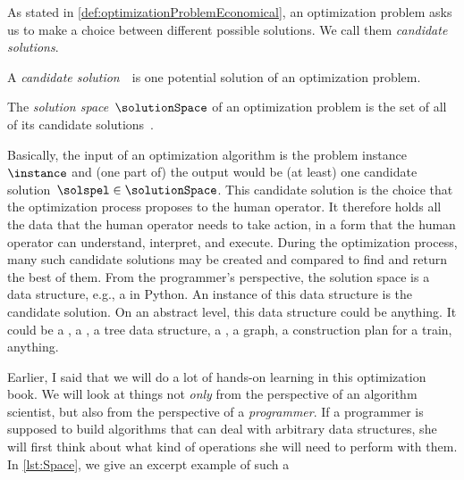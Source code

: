 %
\label{sec:solutionSpace}%
%
%
\label{sec:solutionSpaceDefinitions}%
%
As stated in \autoref{def:optimizationProblemEconomical}, an optimization problem asks us to make a choice between different possible solutions.
We call them \emph{candidate solutions}.
%
\begin{definition}%
\label{def:candidateSolution}%
A \emph{candidate solution}~\solspel\ is one potential solution of an optimization problem.%
\end{definition}%
%
\begin{definition}%
\label{def:solutionSpace}%
The \emph{solution space}~$\solutionSpace$ of an optimization problem is the set of all of its candidate solutions~\solspel.%
\end{definition}%
%
%
%
Basically, the input of an optimization algorithm is the problem instance~$\instance$ and (one part of) the output would be (at least) one candidate solution~$\solspel\in\solutionSpace$.
This candidate solution is the choice that the optimization process proposes to the human operator.
It therefore holds all the data that the human operator needs to take action, in a form that the human operator can understand, interpret, and execute.
During the optimization process, many such candidate solutions may be created and compared to find and return the best of them.%
%
\endhsection%
%
%
%
From the programmer's perspective, the solution space is a data structure, e.g., a  in Python.
An instance of this data structure is the candidate solution.
On an abstract level, this data structure could be anything.
It could be a , a \numpyndarray, a tree data structure, a , a graph, a construction plan for a train, anything.

Earlier, I said that we will do a lot of hands-on learning in this optimization book.
We will look at things not \emph{only} from the perspective of an algorithm scientist, but also from the perspective of a \emph{programmer}.
If a programmer is supposed to build algorithms that can deal with arbitrary data structures, she will first think about what kind of operations she will need to perform with them.
In \autoref{lst:Space}, we give an excerpt example of such a 


